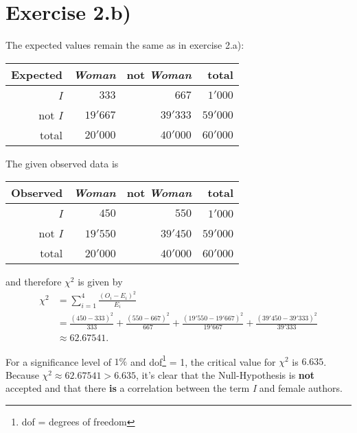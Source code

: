 \documentclass[a4paper]{article}
\begin{document}
\section*{Exercise 2.b)}
The expected values remain the same as in exercise 2.a):

\begin{table}[h]
\centering
\begin{tabular}{r|r r|r}
	\textbf{Expected} 	& \textit{Woman}						& not \textit{Woman} 					& total \\ \hline
    \textit{I} 		& $333 $ 	& $667$ 	& $1'000$ \\
	not \textit{I} 	& $19'667$	& $39'333$	& $59'000$ \\ \hline
    total 			& $20'000$	& $40'000$	& $60'000$
\end{tabular}
\end{table}

\noindent The given observed data is
\begin{table}[h]
\centering
\begin{tabular}{r|r r|r}
	\textbf{Observed} 		& \textit{Woman}	& not \textit{Woman} 	& total \\\hline
	\textit{I} 		& $450$ 				& $550$ 				& $1'000$	\\
	not \textit{I} 	& $19'550$	 			& $39'450$				& $59'000$ \\ \hline
    total 			& $20'000$	 			& $40'000$ 				& $60'000$
\end{tabular}
\end{table}

\noindent and therefore $\chi^2$ is given by
\begin{align*}
\chi^2 &= \sum_{i=1}^4 \frac{(O_i - E_i)^2}{E_i} \\
&= \frac{(450-333)^2}{333} + \frac{(550 - 667)^2}{667} + \frac{(19'550-19'667)^2}{19'667} + \frac{(39'450-39'333)^2}{39'333} \\
& \approx 62.67541.
\end{align*}



\noindent For a significance level of $1\%$ and dof\footnote{dof = degrees of freedom} = 1, the critical value for $\chi^2$ is $6.635$. 
Because $\chi^2 \approx 62.67541 > 6.635$, it's clear that the Null-Hypothesis is \textbf{not} accepted and that there \textbf{is} a correlation between the term \textit{I} and female authors.
\end{document}
